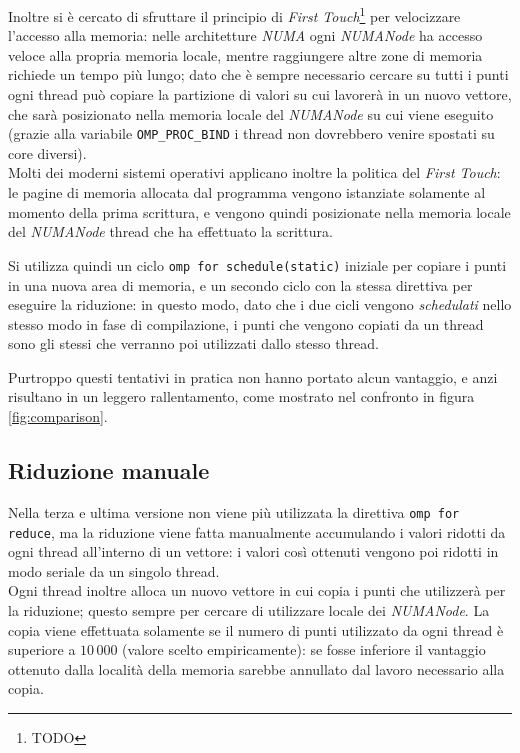 Inoltre si è cercato di sfruttare il principio di \emph{First Touch}\footnote{TODO} per velocizzare l'accesso alla memoria:
nelle architetture \emph{NUMA} ogni \emph{NUMANode} ha accesso veloce alla propria memoria locale, mentre raggiungere altre zone di memoria richiede un tempo più lungo;
dato che è sempre necessario cercare su tutti i punti ogni thread può copiare la partizione di valori su cui lavorerà in un nuovo vettore,
che sarà posizionato nella memoria locale del \emph{NUMANode} su cui viene eseguito
(grazie alla variabile \texttt{OMP\_PROC\_BIND} i thread non dovrebbero venire spostati su core diversi).\\
Molti dei moderni sistemi operativi applicano inoltre la politica del \emph{First Touch}: le pagine di memoria allocata dal programma vengono istanziate solamente al momento della prima
scrittura, e vengono quindi posizionate nella memoria locale del \emph{NUMANode} thread che ha effettuato la scrittura.

Si utilizza quindi un ciclo \texttt{omp for schedule(static)} iniziale per copiare i punti in una nuova area di memoria, e un secondo ciclo con la stessa direttiva per eseguire la riduzione: in questo modo, dato che i due cicli vengono \emph{schedulati} nello stesso modo in fase di compilazione, i punti che vengono copiati da un thread sono gli stessi che verranno poi utilizzati dallo stesso thread.

Purtroppo questi tentativi in pratica non hanno portato alcun vantaggio, e anzi risultano in un leggero rallentamento, come mostrato nel confronto in figura \ref{fig:comparison}.

\subsection{Riduzione manuale}
Nella terza e ultima versione non viene più utilizzata la direttiva \texttt{omp for reduce}, ma la riduzione viene fatta manualmente accumulando i valori
ridotti da ogni thread all'interno di un vettore: i valori così ottenuti vengono poi ridotti in modo seriale da un singolo thread.\\
Ogni thread inoltre alloca un nuovo vettore in cui copia i punti che utilizzerà per la riduzione; questo sempre per cercare di utilizzare locale dei \emph{NUMANode}.
La copia viene effettuata solamente se il numero di punti utilizzato da ogni thread è superiore a $10\,000$ (valore scelto empiricamente):
se fosse inferiore il vantaggio ottenuto dalla località della memoria sarebbe annullato dal lavoro necessario alla copia.

